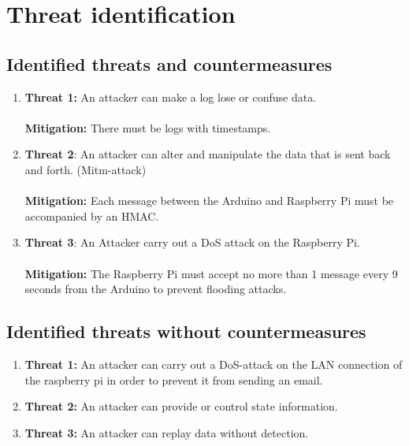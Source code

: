 \section{Threat identification}
\label{chapter3}

\subsection{Identified threats and countermeasures}

	\begin{enumerate}
		\item  \textbf{Threat 1:}
            An attacker can make a log lose or confuse data. \\ \\         
             \textbf{Mitigation:}
            There must be logs with timestamps.
		\item \textbf{Threat 2}:
            An attacker can alter and manipulate the data that is sent back and forth. (Mitm-attack)\\ \\
            \textbf{Mitigation:}
            Each message between the Arduino and Raspberry Pi must be accompanied by an HMAC.
		\item \textbf{Threat 3}:
            An Attacker carry out a DoS attack on the Raspberry Pi.\\ \\
            \textbf{Mitigation:}
            The Raspberry Pi must accept no more than 1 message every 9 seconds from the Arduino to prevent flooding attacks.
            \end{enumerate}
	
\subsection{Identified threats without countermeasures}

	\begin{enumerate}
		\item \textbf{Threat 1:} 
            An attacker can carry out a DoS-attack on the LAN connection of the raspberry pi in order to prevent it from sending an email.
		\item \textbf{Threat 2:}
            An attacker can provide or control state information.
		\item \textbf{Threat 3:}
            An attacker can replay data without detection.            
	\end{enumerate}